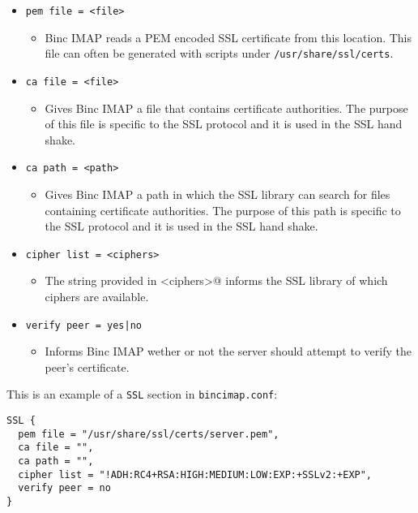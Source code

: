 \documentclass[11pt,a4paper,twoside,openright]{report}
\begin{document}
\begin{itemize}

\item \texttt{pem file = <file>}
  \begin{itemize}
    \item [] Binc IMAP reads a PEM encoded SSL certificate from this
      location. This file can often be generated with scripts under
      \texttt{/usr/share/ssl/certs}.
  \end{itemize}

\item \texttt{ca file = <file>}
  \begin{itemize}
    \item [] Gives Binc IMAP a file that contains certificate
      authorities.  The purpose of this file is specific to the SSL
      protocol and it is used in the SSL hand shake.
  \end{itemize}

\item \texttt{ca path = <path>}
  \begin{itemize}
    \item [] Gives Binc IMAP a path in which the SSL library can
      search for files containing certificate authorities.  The
      purpose of this path is specific to the SSL protocol and it is
      used in the SSL hand shake.
  \end{itemize}

\item \texttt{cipher list = <ciphers>}
  \begin{itemize}
    \item [] The string provided in \Verb@<ciphers>@ informs the SSL
      library of which ciphers are available.
  \end{itemize}

\item \texttt{verify peer = yes{|}no}
  \begin{itemize}
    \item [] Informs Binc IMAP wether or not the server should attempt
      to verify the peer's certificate.
  \end{itemize}

\end{itemize}
This is an example of a \texttt{SSL} section in
\texttt{bincimap.conf}:

\begin{Verbatim}
SSL {
  pem file = "/usr/share/ssl/certs/server.pem",
  ca file = "",
  ca path = "",
  cipher list = "!ADH:RC4+RSA:HIGH:MEDIUM:LOW:EXP:+SSLv2:+EXP",
  verify peer = no
}
\end{Verbatim}
\end{document}
